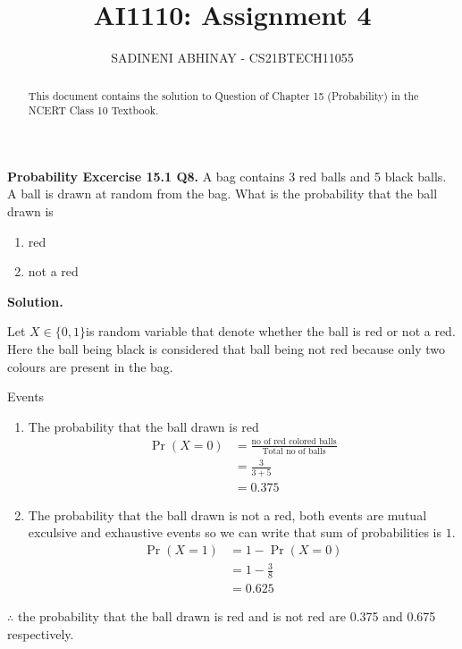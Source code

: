 \documentclass[journal,12pt,twocolumn]{IEEEtran}
\title{
	AI1110: Assignment 4
}
\author{ 
	SADINENI ABHINAY - CS21BTECH11055
}
\providecommand{\pr}[1]{\ensuremath{\Pr\left(#1\right)}}
\begin{document}
	\maketitle
	\begin{abstract}
		This document contains the solution to Question of Chapter 15 (Probability) in the NCERT Class 10 Textbook.
	\end{abstract}
	
	\textbf{Probability Excercise 15.1 Q8.}
	A bag contains 3 red balls and 5 black balls. A ball is drawn at random from the bag. What is the probability that the ball drawn is 
	\begin{enumerate}
		\item red
		\item not a red
	\end{enumerate}
	
	\textbf{Solution.}
	
	Let $X \in \{0,1\} $is random variable that denote whether the ball is red or not a red.
	Here the ball being black is considered that ball being not red because only two colours are present in the bag.
	
	\begin{table}[ht!]
	\centering
	
	\caption{Events}
	\label{table:1}
	\end{table}
	\begin{enumerate}
	\item The probability that the ball drawn is red 
	   \begin{align}
	   	\pr{X=0}&=\frac{\text{no of red colored balls}}{\text{Total no of balls}}\\
	   	        &=\frac{3}{3+5}\\
	   	        &=0.375
	   \end{align}
	\item The probability that the ball drawn is not a red, both events are mutual exculsive and exhaustive events so we can write that sum of probabilities is $1$.
	\begin{align}
		\pr{X=1}&=1-\pr{X=0}\\
		&=1-\frac{3}{8}\\
		&=0.625
	\end{align}
\end{enumerate}
$\therefore$ the probability that the ball drawn is red and is not red are 0.375 and 0.675 respectively.
\end{document}
